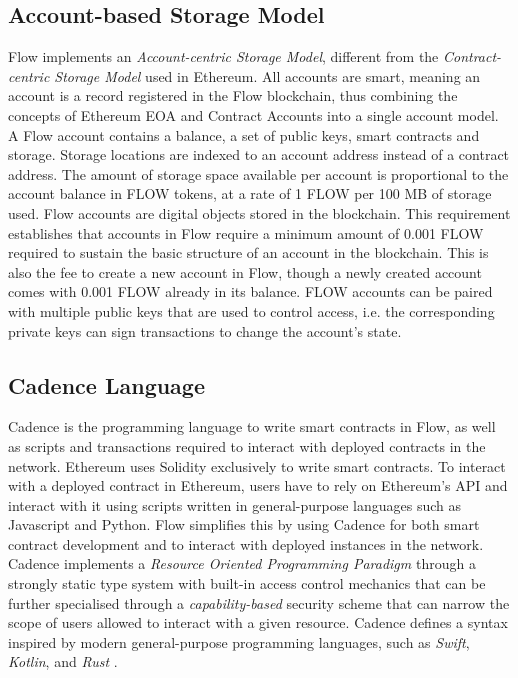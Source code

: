 \documentclass[../NFTComp_IEEE.tex]{subfiles}
\begin{document}
\subsection{Account-based Storage Model}
Flow implements an \textit{Account-centric Storage Model}, different from the \textit{Contract-centric Storage Model} used in Ethereum.
All accounts are smart, meaning an account is a record registered in the Flow blockchain, thus combining the concepts of Ethereum EOA and Contract Accounts into a single account model. A Flow account contains a balance, a set of public keys, smart contracts and storage. Storage locations are indexed to an account address instead of a contract address. The amount of storage space available per account is proportional to the account balance in FLOW tokens, at a rate of 1 FLOW per 100 MB of storage used. Flow accounts are digital objects stored in the blockchain. This requirement establishes that accounts in Flow require a minimum amount of 0.001 FLOW required to sustain the basic structure of an account in the blockchain. This is also the fee to create a new account in Flow, though a newly created account comes with 0.001 FLOW already in its balance. FLOW accounts can be paired with multiple public keys that are used to control access, i.e. the corresponding private keys can sign transactions to change the account's state.

\subsection{Cadence Language}
\label{sec:cadence_language}
Cadence is the programming language to write smart contracts in Flow, as well as scripts and transactions required to interact with deployed contracts in the network. Ethereum uses Solidity exclusively to write smart contracts. To interact with a deployed contract in Ethereum, users have to rely on Ethereum's API and interact with it using scripts written in general-purpose languages such as Javascript and Python. Flow simplifies this by using Cadence for both smart contract development and to interact with deployed instances in the network. Cadence implements a \textit{Resource Oriented Programming Paradigm} through a strongly static type system with built-in access control mechanics that can be further specialised through a \textit{capability-based} security scheme that can narrow the scope of users allowed to interact with a given resource. Cadence defines a syntax inspired by modern general-purpose programming languages, such as \textit{Swift}, \textit{Kotlin}, and \textit{Rust} \cite{flow2020a} \cite{Cadence2023}.
\end{document}
